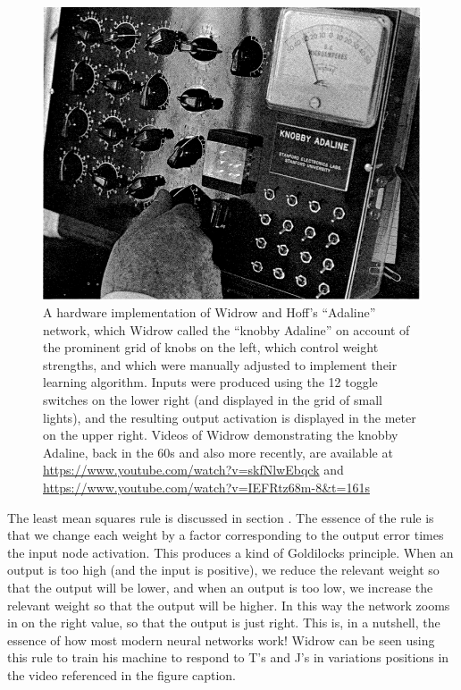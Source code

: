 \begin{figure}[h]
\centering
\includegraphics[scale=.3]{./images/adaline.png}
\caption[From \cite{widrow1963adaline}.]{A hardware implementation of Widrow and Hoff's ``Adaline'' network, which Widrow called the ``knobby Adaline'' on account of the prominent grid of knobs on the left, which control weight strengths, and which were manually adjusted to implement their learning algorithm. Inputs were produced using the 12 toggle switches on the lower right (and displayed in the grid of small lights), and the resulting output activation is displayed in the meter on the upper right. Videos of Widrow demonstrating the knobby Adaline, back in the 60s and also more recently, are available at \url{https://www.youtube.com/watch?v=skfNlwEbqck} and \url{https://www.youtube.com/watch?v=IEFRtz68m-8&t=161s}}
\label{adaline}
\end{figure}

The least mean squares rule is discussed in section . The essence of the rule is that we change each weight by a factor corresponding to the output error times the input node activation. This produces a kind of Goldilocks principle. When an output is too high (and the input is positive), we reduce the relevant weight so that the output will be lower, and  when an output is too low, we increase the relevant weight so that the output will be higher. In this way the network zooms in on the right value, so that the output is just right. This is, in a nutshell, the essence of how most modern neural networks work!  Widrow can be seen using this rule to train his machine to respond to T's and J's in variations positions in the video referenced in the figure caption. 


